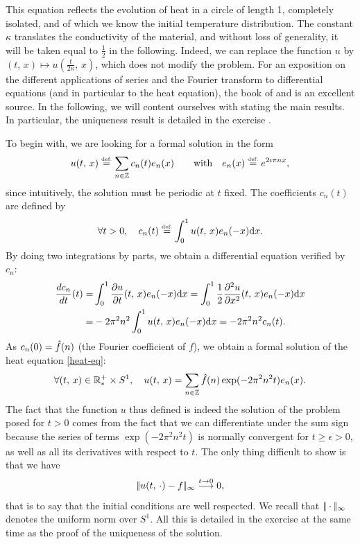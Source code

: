  
This equation reflects the evolution of heat in a circle of length 1, completely isolated, and of which we know the initial temperature distribution. The constant $ \kappa $ translates the conductivity of the material, and without loss of generality, it will be taken equal to $ \frac{1}{2} $ in the following. Indeed, we can replace the function $ u $ by $ (t, \, x) \mapsto u \left(\frac{t}{2 \kappa}, \, x \right) $, which does not modify the problem. For an exposition on the different applications of series and the Fourier transform to differential equations (and in particular to the heat equation), the book of  and  \cite{dym} is an excellent source. In the following, we will content ourselves with stating the main results. In particular, the uniqueness result is detailed in the exercise .
 
 
 To begin with, we are looking for a formal solution in the form
\begin{equation*}
u (t, \, x) \stackrel{\mbox{\upshape\tiny def.}}{=} \sum_{n \in \mathbb{Z}}{c_n (t) e_n (x)} \quad \quad \text{with} \quad e_n (x) \stackrel{\mbox{\upshape\tiny def.}}{=} e^{2 \imath \pi nx},
\end{equation*}
since intuitively, the solution must be periodic at $ t $ fixed. The coefficients $ c_n (t) $ are defined by
\begin{equation*}
\forall t> 0, \quad c_n (t) \stackrel{\mbox{\upshape\tiny def.}}{=} \int_0^1{u (t, \, x) e_n (-x)} \mathrm{d} x.
\end{equation*}
By doing two integrations by parts, we obtain a differential equation verified by $ c_n $:
\begin{equation*}
\begin{split}
\frac{d c_n}{dt} (t) = & \int_0^1{\frac{ \partial u}{\partial t} (t, \, x) e_n (-x) \mathrm{d} x} = \int_0^1{\frac{1}{2} \frac{ \partial^2 u}{\partial x^2} (t, \, x) e_n (-x) \mathrm{d} x} \\
= & - 2 \pi^2 n^2 \int_0^1{u (t, \, x) e_n (-x) \mathrm{d} x} = -2 \pi^2 n^2 c_n (t).
\end{split}
\end{equation*}
As $ c_n (0) = \hat{f} (n) $ (the  Fourier coefficient of $ f $), we obtain a formal solution of the heat equation \eqref{heat-eq}:
\begin{equation}
\label{eq-solution-heat-equation}
\forall (t, \, x) \in \mathbb{R}_*^{+} \times S^1, \quad u (t, \, x) = \sum_{n \in \mathbb{Z}}{\hat{f} (n) \exp (-2 \pi^2n^2 t) e_n (x)}.
\end{equation}
The fact that the function $ u $ thus defined is indeed the solution of the problem posed for $ t> 0 $ comes from the fact that we can differentiate under the sum sign because the series of terms $ \exp (-2 \pi^2n^2 t) $ is normally convergent for $ t \geq \epsilon> 0 $, as well as all its derivatives with respect to $ t $. The only thing difficult to show is that we have
\begin{equation*}
|\!| u (t, \, \cdot) - f |\!|_{\infty} \overset{t \to 0}{\longrightarrow} 0,
\end{equation*}
that is to say that the initial conditions are well respected. We recall that $ |\!| \cdot |\!|_\infty $ denotes the uniform norm over $ S^1 $. All this is detailed in the exercise  at the same time as the proof of the uniqueness of the solution.
 
